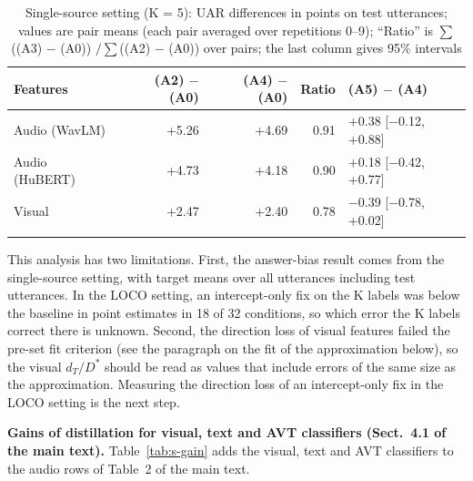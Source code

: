 \documentclass[sn-nature,pdflatex]{sn-jnl}
\begin{document}
\begin{table}[h]
\caption{Single-source setting (K = 5): UAR differences in points on test utterances; values are pair means (each pair averaged over repetitions 0--9); ``Ratio'' is $\sum$((A3) $-$ (A0)) $/ \sum$((A2) $-$ (A0)) over pairs; the last column gives 95\% intervals}\label{tab:s-single}
\footnotesize
\begin{tabular}{@{}lrrrl@{}}
\toprule
Features & (A2) $-$ (A0) & (A4) $-$ (A0) & Ratio & (A5) $-$ (A4) \\
\midrule
Audio (WavLM) & +5.26 & +4.69 & 0.91 & +0.38 [$-$0.12, +0.88] \\
Audio (HuBERT) & +4.73 & +4.18 & 0.90 & +0.18 [$-$0.42, +0.77] \\
Visual & +2.47 & +2.40 & 0.78 & $-$0.39 [$-$0.78, +0.02] \\
\botrule
\end{tabular}
\end{table}

This analysis has two limitations. First, the answer-bias result comes from the single-source setting, with target means over all utterances including test utterances. In the LOCO setting, an intercept-only fix on the K labels was below the baseline in point estimates in 18 of 32 conditions, so which error the K labels correct there is unknown. Second, the direction loss of visual features failed the pre-set fit criterion (see the paragraph on the fit of the approximation below), so the visual $d_T/D^{*}$ should be read as values that include errors of the same size as the approximation. Measuring the direction loss of an intercept-only fix in the LOCO setting is the next step.

\textbf{Gains of distillation for visual, text and AVT classifiers (Sect.~4.1 of the main text).} Table~\ref{tab:s-gain} adds the visual, text and AVT classifiers to the audio rows of Table~2 of the main text.
\end{document}
